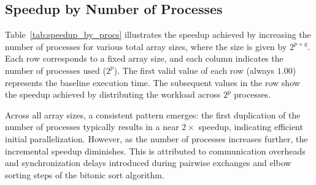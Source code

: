 \documentclass{article}
\begin{document}
\subsection{Speedup by Number of Processes}

Table~\ref{tab:speedup_by_procs} illustrates the speedup achieved by increasing the number of processes for 
various total array sizes, where the size is given by $2^{p + q}$. Each row corresponds to a fixed array size, 
and each column indicates the number of processes used ($2^p$). The first valid value of each row (always $1.00$)
represents the baseline execution time. The subsequent values in the row show the speedup achieved by distributing
the workload across $2^p$ processes.

Across all array sizes, a consistent pattern emerges: the first duplication of the number of processes typically
results in a near $2\times$ speedup, indicating efficient initial parallelization. However, as the number of 
processes increases further, the incremental speedup diminishes. This is attributed to communication overheads 
and synchronization delays introduced during pairwise exchanges and elbow sorting steps of the bitonic sort 
algorithm.
\end{document}
